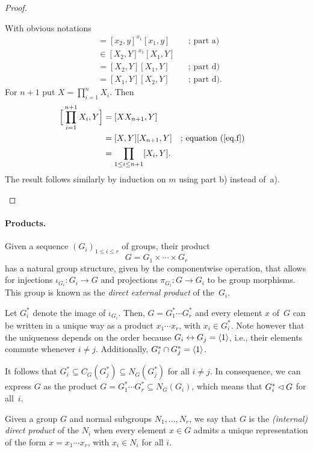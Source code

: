 \begin{proof}
\begin{enumerate}[\upshape a)]
    With obvious notations
    \begin{align*}
        [x_1x_2,y] &= [x_2,y]^{x_1}[x_1,y]    &&\text{; part a)}\\
            &\in [X_2,Y]^{x_1}[X_1,Y]\\
            &= [X_2,Y][X_1,Y]    &&\text{; part d)}\\
            &= [X_1,Y][X_2,Y]    &&\text{; part d).}
    \end{align*}
    For $n+1$ put $X=\prod_{i=1}^nX_i$. Then
    \begin{align*}
        \Big[\prod_{i=1}^{n+1}X_i, Y\Big]
            &= [XX_{n+1},Y]\\
            &= [X,Y][X_{n+1},Y] &&\text{; equation }(\ref{eq.f})\\
            &= \prod_{1\le i\le n+1}[X_i,Y].
    \end{align*}
    The result follows similarly by induction on $m$ using part b) instead of~a).
\end{enumerate}
\end{proof}

\paragraph{Products.}
    Given a sequence $(G_i)_{1\le i\le r}$ of groups, their product
    $$
        G=G_1\times\cdots\times G_r
    $$
    has a natural group structure, given by the componentwise operation, that allows for injections $\iota_{G_i}\colon G_i\to G$ and projections $\pi_{G_i}\colon G\to G_i$ to be group morphisms. This group is known as the \textsl{direct external product} of the~$G_i$.

    Let\/ $G_i^*$ denote the image of\/ $\iota_{G_i}$. Then, $G=G_1^*\cdots G_r^* $ and every element $x$ of\/~$G$ can be written in a unique way as a product $x_1\cdots x_r$, with $x_i\in G_i^*$. Note however that the uniqueness depends on the order because $G_i\mathrel\leftrightarrow G_j=\langle1\rangle$, i.e., their elements commute whenever $i\ne j$. Additionally, $G_i^*\cap G_j^*=\langle1\rangle$.

    It follows that $G_i^*\subseteq C_G(G_j^*)\subseteq N_G(G_j^*)$ for all $i\ne j$. In consequence, we can express $G$ as the product $G=G_1^*\cdots G_r^*\subseteq N_G(G_i)$, which means that $G_i^*\lhd G$ for all~$i$.


\begin{defn}
    Given a group $G$ and normal subgroups $N_1,\dots,N_r$, we say that $G$ is the \textsl{(internal) direct product} of the $N_i$ when every element $x\in G$ admits a unique representation of the form $x=x_1\cdots x_r$, with $x_i\in N_i$ for all $i$.
\end{defn}

